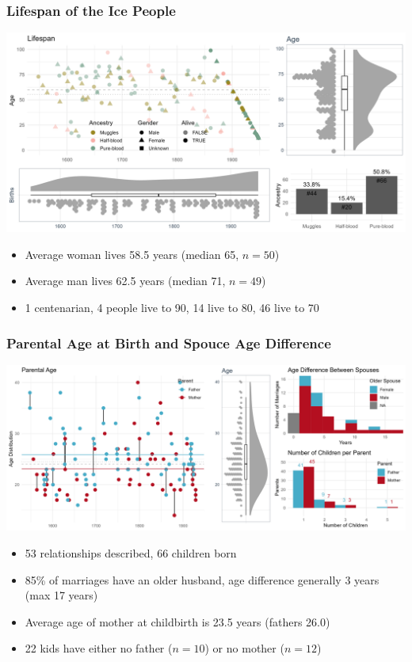 \begin{frame}
    \frametitle{Lifespan of the Ice People}
    \includegraphics[width=\textwidth]{../R/figures/family_birth}
    \vspace{-18pt}
    \begin{itemize}
        \item Average woman lives 58.5 years (median 65, $n=50$)
        \item Average man lives 62.5 years (median 71, $n=49$)
        \item 1 centenarian, 4 people live to 90, 14 live to 80, 46 live to 70
    \end{itemize}
\end{frame}

\begin{frame}
    \frametitle{Parental Age at Birth and Spouce Age Difference}
    \includegraphics[width=\textwidth]{../R/figures/family_parent_age}
    \vspace{-18pt}
    \begin{itemize}
        \item 53 relationships described, 66 children born
        \item 85\% of marriages have an older husband, age difference generally 3 years (max 17 years)
        \item Average age of mother at childbirth is 23.5 years (fathers 26.0)
        \item 22 kids have either no father ($n=10$) or no mother ($n=12$)
    \end{itemize}
\end{frame}
